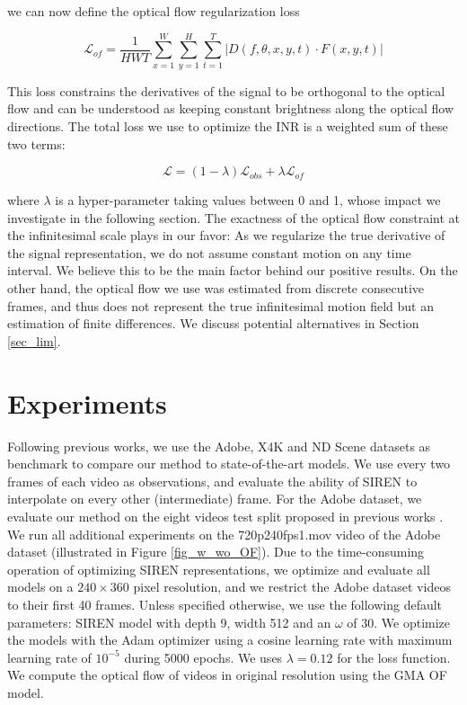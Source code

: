 \documentclass{article}
\begin{document}
we can now define the optical flow regularization loss

\begin{equation}
\mathcal{L}_{of} = \frac{1}{HWT} \sum_{x=1}^W\sum_{y=1}^H\sum_{t=1}^T | D(f, \theta, x, y, t) \cdot F(x, y, t) |
\end{equation}

This loss constrains the derivatives of the signal to be orthogonal to the optical flow and
can be understood as keeping constant brightness along the optical flow directions.
The total loss we use to optimize the INR is a weighted sum of these two terms:

\begin{equation}
\mathcal{L} = (1-\lambda) \mathcal{L}_{obs} + \lambda \mathcal{L}_{of}
\end{equation}

where $\lambda$ is a hyper-parameter taking values between 0 and 1, whose impact we investigate in the following section.
The exactness of the optical flow constraint at the infinitesimal scale plays in our favor:
As we regularize the true derivative of the signal representation,
we do not assume constant motion on any time interval.
We believe this to be the main factor behind our positive results.
On the other hand, the optical flow we use was estimated from discrete consecutive frames,
and thus does not represent the true infinitesimal motion field but an estimation of finite differences.
We discuss potential alternatives in Section \ref{sec_lim}.

\section{Experiments}
\label{sec_exp}

Following previous works, we use the Adobe\cite{su2017deep}, X4K\cite{sim2021xvfi} and ND Scene\cite{yoon2020novel}
datasets as benchmark to compare our method to state-of-the-art models.
We use every two frames of each video as observations,
and evaluate the ability of SIREN to interpolate on every other (intermediate) frame.
For the Adobe dataset, we evaluate our method on the eight videos test split proposed in previous works \citep{jiang2018super}.
We run all additional experiments on the 720p240fps1.mov video of the Adobe dataset (illustrated in Figure \ref{fig_w_wo_OF}).
Due to the time-consuming operation of optimizing SIREN representations,
we optimize and evaluate all models on a $240 \times 360$ pixel resolution,
and we restrict the Adobe dataset videos to their first 40 frames.
Unless specified otherwise, we use the following default parameters:
SIREN model with depth 9, width 512 and an $\omega$ of 30.
We optimize the models with the Adam optimizer using a cosine learning rate with maximum learning rate of $10^{-5}$ during 5000 epochs.
We uses $\lambda = 0.12$ for the loss function. We compute the optical flow of videos in original resolution using the GMA \cite{jiang2021learning} OF model.
\end{document}
